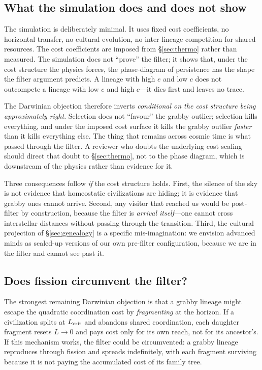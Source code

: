 \documentclass[11pt,a4paper,twocolumn]{article}
\begin{document}
\subsection{What the simulation does and does not show}

The simulation is deliberately minimal. It uses fixed cost
coefficients, no horizontal transfer, no cultural evolution, no
inter-lineage competition for shared resources. The cost coefficients
are imposed from \S\ref{sec:thermo} rather than measured. The
simulation does not ``prove'' the filter; it shows that, under the
cost structure the physics forces, the phase-diagram of persistence
has the shape the filter argument predicts. A lineage with high $e$
and low $c$ does not outcompete a lineage with low $e$ and high
$c$---it dies first and leaves no trace.

The Darwinian objection therefore inverts \emph{conditional on the
cost structure being approximately right}. Selection does not
``favour'' the grabby outlier; selection kills everything, and under
the imposed cost surface it kills the grabby outlier \emph{faster}
than it kills everything else. The thing that remains across cosmic
time is what passed through the filter. A reviewer who doubts the
underlying cost scaling should direct that doubt to
\S\ref{sec:thermo}, not to the phase diagram, which is downstream of
the physics rather than evidence for it.

Three consequences follow \emph{if} the cost structure holds. First,
the silence of the sky is not evidence that homeostatic civilizations
are hiding; it is evidence that grabby ones cannot arrive. Second,
any visitor that reached us would be post-filter by construction,
because the filter is \emph{arrival itself}---one cannot cross
interstellar distances without passing through the transition. Third,
the cultural projection of \S\ref{sec:genealogy} is a specific
mis-imagination: we envision advanced minds as scaled-up versions of
our own pre-filter configuration, because we are in the filter and
cannot see past it.

\subsection{Does fission circumvent the filter?}
\label{sec:fission}

The strongest remaining Darwinian objection is that a grabby lineage
might escape the quadratic coordination cost by \emph{fragmenting}
at the horizon. If a civilization splits at $L_{\rm crit}$ and
abandons shared coordination, each daughter fragment resets $L
\to 0$ and pays cost only for its own reach, not for its ancestor's.
If this mechanism works, the filter could be circumvented: a grabby
lineage reproduces through fission and spreads indefinitely, with
each fragment surviving because it is not paying the accumulated
cost of its family tree.
\end{document}
